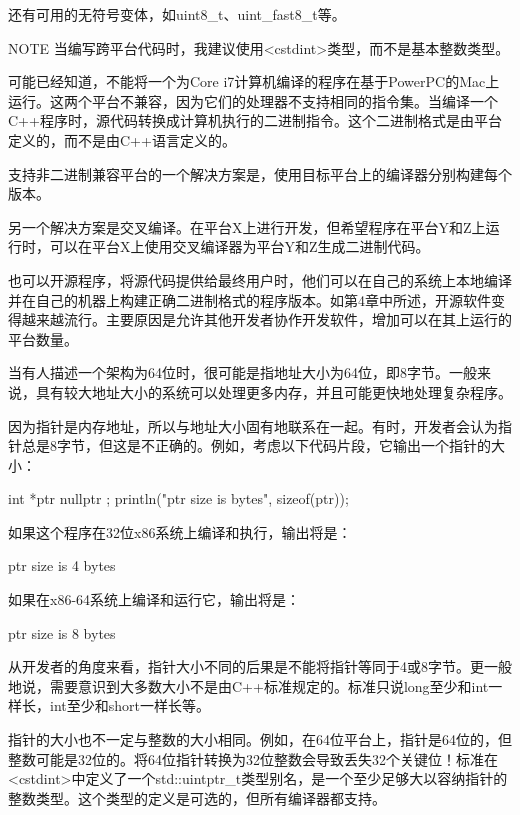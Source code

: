 还有可用的无符号变体，如uint8\_t、uint\_fast8\_t等。

\begin{myNotic}{NOTE}
当编写跨平台代码时，我建议使用<cstdint>类型，而不是基本整数类型。
\end{myNotic}


可能已经知道，不能将一个为Core i7计算机编译的程序在基于PowerPC的Mac上运行。这两个平台不兼容，因为它们的处理器不支持相同的指令集。当编译一个C++程序时，源代码转换成计算机执行的二进制指令。这个二进制格式是由平台定义的，而不是由C++语言定义的。

支持非二进制兼容平台的一个解决方案是，使用目标平台上的编译器分别构建每个版本。

另一个解决方案是交叉编译。在平台X上进行开发，但希望程序在平台Y和Z上运行时，可以在平台X上使用交叉编译器为平台Y和Z生成二进制代码。

也可以开源程序，将源代码提供给最终用户时，他们可以在自己的系统上本地编译并在自己的机器上构建正确二进制格式的程序版本。如第4章中所述，开源软件变得越来越流行。主要原因是允许其他开发者协作开发软件，增加可以在其上运行的平台数量。


当有人描述一个架构为64位时，很可能是指地址大小为64位，即8字节。一般来说，具有较大地址大小的系统可以处理更多内存，并且可能更快地处理复杂程序。

因为指针是内存地址，所以与地址大小固有地联系在一起。有时，开发者会认为指针总是8字节，但这是不正确的。例如，考虑以下代码片段，它输出一个指针的大小：

\begin{cpp}
int *ptr { nullptr };
println("ptr size is {} bytes", sizeof(ptr));
\end{cpp}

如果这个程序在32位x86系统上编译和执行，输出将是：

\begin{shell}
ptr size is 4 bytes
\end{shell}

如果在x86-64系统上编译和运行它，输出将是：

\begin{shell}
ptr size is 8 bytes
\end{shell}

从开发者的角度来看，指针大小不同的后果是不能将指针等同于4或8字节。更一般地说，需要意识到大多数大小不是由C++标准规定的。标准只说long至少和int一样长，int至少和short一样长等。

指针的大小也不一定与整数的大小相同。例如，在64位平台上，指针是64位的，但整数可能是32位的。将64位指针转换为32位整数会导致丢失32个关键位！标准在<cstdint>中定义了一个std::uintptr\_t类型别名，是一个至少足够大以容纳指针的整数类型。这个类型的定义是可选的，但所有编译器都支持。

